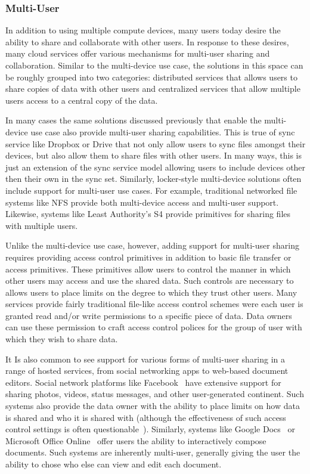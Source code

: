 \subsubsection{Multi-User}

In addition to using multiple compute devices, many users today desire
the ability to share and collaborate with other users. In response to
these desires, many cloud services offer various mechanisms for
multi-user sharing and collaboration. Similar to the multi-device use
case, the solutions in this space can be roughly grouped into two
categories: distributed services that allows users to share copies of
data with other users and centralized services that allow multiple
users access to a central copy of the data.

In many cases the same solutions discussed previously that enable the
multi-device use case also provide multi-user sharing
capabilities. This is true of sync service like Dropbox or Drive that
not only allow users to sync files amongst their devices, but also
allow them to share files with other users. In many ways, this is just
an extension of the sync service model allowing users to include
devices other then their own in the sync set. Similarly, locker-style
multi-device solutions often include support for multi-user use
cases. For example, traditional networked file systems like NFS
provide both multi-device access and multi-user support. Likewise,
systems like Least Authority's S4 provide primitives for sharing files
with multiple users.

Unlike the multi-device use case, however, adding support for
multi-user sharing requires providing access control primitives in
addition to basic file transfer or access primitives. These primitives
allow users to control the manner in which other users may access and
use the shared data. Such controls are necessary to allows users to
place limits on the degree to which they trust other users. Many
services provide fairly traditional file-like access control schemes
were each user is granted read and/or write permissions to a specific
piece of data. Data owners can use these permission to craft access
control polices for the group of user with which they wish to share
data.

It Is also common to see support for various forms of multi-user
sharing in a range of hosted services, from social networking apps to
web-based document editors. Social network platforms like
Facebook~\cite{facebook} have extensive support for sharing photos,
videos, status messages, and other user-generated continent. Such
systems also provide the data owner with the ability to place limits
on how data is shared and who it is shared with (although the
effectiveness of such access control settings is often
questionable~\cite{johnson2012}). Similarly, systems like Google
Docs~\cite{google-docs} or Microsoft Office
Online~\cite{microsoft-officeonline} offer users the ability to
interactively compose documents. Such systems are inherently
multi-user, generally giving the user the ability to chose who else
can view and edit each document.

